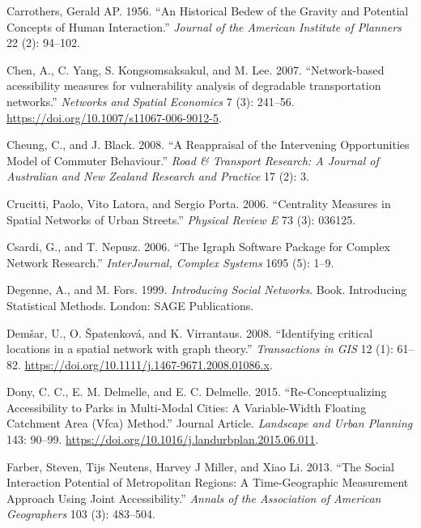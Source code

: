 \documentclass[]{elsarticle} %
\begin{document}
\leavevmode\hypertarget{ref-Carrothers1956historical}{}%
Carrothers, Gerald AP. 1956. ``An Historical Bedew of the Gravity and
Potential Concepts of Human Interaction.'' \emph{Journal of the American
Institute of Planners} 22 (2): 94--102.

\leavevmode\hypertarget{ref-Chen2007}{}%
Chen, A., C. Yang, S. Kongsomsaksakul, and M. Lee. 2007. ``Network-based
acessibility measures for vulnerability analysis of degradable
transportation networks.'' \emph{Networks and Spatial Economics} 7 (3):
241--56. \url{https://doi.org/10.1007/s11067-006-9012-5}.

\leavevmode\hypertarget{ref-Cheung2008}{}%
Cheung, C., and J. Black. 2008. ``A Reappraisal of the Intervening
Opportunities Model of Commuter Behaviour.'' \emph{Road \& Transport
Research: A Journal of Australian and New Zealand Research and Practice}
17 (2): 3.

\leavevmode\hypertarget{ref-crucitti2006centrality}{}%
Crucitti, Paolo, Vito Latora, and Sergio Porta. 2006. ``Centrality
Measures in Spatial Networks of Urban Streets.'' \emph{Physical Review
E} 73 (3): 036125.

\leavevmode\hypertarget{ref-igraph}{}%
Csardi, G., and T. Nepusz. 2006. ``The Igraph Software Package for
Complex Network Research.'' \emph{InterJournal, Complex Systems} 1695
(5): 1--9.

\leavevmode\hypertarget{ref-Degenne1999}{}%
Degenne, A., and M. Fors. 1999. \emph{Introducing Social Networks}.
Book. Introducing Statistical Methods. London: SAGE Publications.

\leavevmode\hypertarget{ref-Demsar2008}{}%
Demšar, U., O. Špatenková, and K. Virrantaus. 2008. ``Identifying
critical locations in a spatial network with graph theory.''
\emph{Transactions in GIS} 12 (1): 61--82.
\url{https://doi.org/10.1111/j.1467-9671.2008.01086.x}.

\leavevmode\hypertarget{ref-Dony2015}{}%
Dony, C. C., E. M. Delmelle, and E. C. Delmelle. 2015.
``Re-Conceptualizing Accessibility to Parks in Multi-Modal Cities: A
Variable-Width Floating Catchment Area (Vfca) Method.'' Journal Article.
\emph{Landscape and Urban Planning} 143: 90--99.
\url{https://doi.org/10.1016/j.landurbplan.2015.06.011}.

\leavevmode\hypertarget{ref-farber2013social}{}%
Farber, Steven, Tijs Neutens, Harvey J Miller, and Xiao Li. 2013. ``The
Social Interaction Potential of Metropolitan Regions: A Time-Geographic
Measurement Approach Using Joint Accessibility.'' \emph{Annals of the
Association of American Geographers} 103 (3): 483--504.
\end{document}
